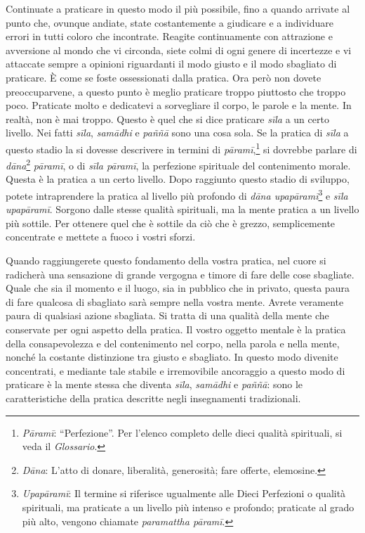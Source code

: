 Continuate a praticare in questo modo il più possibile, fino a quando
arrivate al punto che, ovunque andiate, state costantemente a giudicare
e a individuare errori in tutti coloro che incontrate. Reagite
continuamente con attrazione e avversione al mondo che vi circonda,
siete colmi di ogni genere di incertezze e vi attaccate sempre a
opinioni riguardanti il modo giusto e il modo sbagliato di praticare. È
come se foste ossessionati dalla pratica. Ora però non dovete
preoccuparvene, a questo punto è meglio praticare troppo piuttosto che
troppo poco. Praticate molto e dedicatevi a sorvegliare il corpo, le
parole e la mente. In realtà, non è mai troppo. Questo è quel che si
dice praticare \emph{sīla} a un certo livello. Nei fatti \emph{sīla},
\emph{samādhi} e \emph{paññā} sono una cosa sola. Se la pratica di
\emph{sīla} a questo stadio la si dovesse descrivere in termini di
\emph{pāramī},\footnote{\emph{Pāramī}: ``Perfezione''. Per l'elenco
  completo delle dieci qualità spirituali, si veda il \emph{Glossario}.}
si dovrebbe parlare di \emph{dāna}\footnote{\emph{Dāna}: L'atto di
  donare, liberalità, generosità; fare offerte, elemosine.}
\emph{pāramī}, o di \emph{sīla pāramī}, la perfezione spirituale del
contenimento morale. Questa è la pratica a un certo livello. Dopo
raggiunto questo stadio di sviluppo, potete intraprendere la pratica al
livello più profondo di \emph{dāna upapāramī}\footnote{\emph{Upapāramī}:
  Il termine si riferisce ugualmente alle Dieci Perfezioni o qualità
  spirituali, ma praticate a un livello più intenso e profondo;
  praticate al grado più alto, vengono chiamate \emph{paramattha
  pāramī}.} e \emph{sīla upapāramī}. Sorgono dalle stesse qualità
spirituali, ma la mente pratica a un livello più sottile. Per ottenere
quel che è sottile da ciò che è grezzo, semplicemente concentrate e
mettete a fuoco i vostri sforzi.

Quando raggiungerete questo fondamento della vostra pratica, nel cuore
si radicherà una sensazione di grande vergogna e timore di fare delle
cose sbagliate. Quale che sia il momento e il luogo, sia in pubblico che
in privato, questa paura di fare qualcosa di sbagliato sarà sempre nella
vostra mente. Avrete veramente paura di qualsiasi azione sbagliata. Si
tratta di una qualità della mente che conservate per ogni aspetto della
pratica. Il vostro oggetto mentale è la pratica della consapevolezza e
del contenimento nel corpo, nella parola e nella mente, nonché la
costante distinzione tra giusto e sbagliato. In questo modo divenite
concentrati, e mediante tale stabile e irremovibile ancoraggio a questo
modo di praticare è la mente stessa che diventa \emph{sīla},
\emph{samādhi} e \emph{paññā}: sono le caratteristiche della pratica
descritte negli insegnamenti tradizionali.

